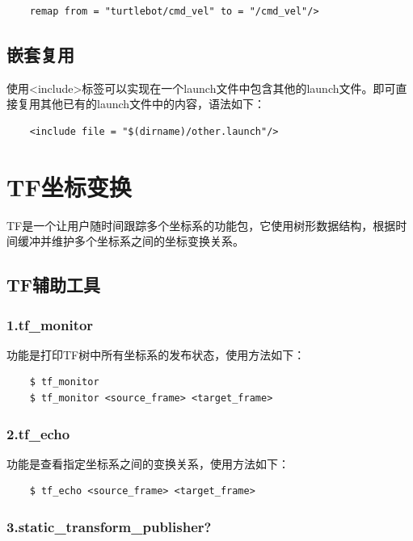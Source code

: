 \documentclass[9pt, oneside]{book}
\begin{document}
\begin{verbatim}
    remap from = "turtlebot/cmd_vel" to = "/cmd_vel"/>
\end{verbatim}

\subsection{嵌套复用}

使用<include>标签可以实现在一个launch文件中包含其他的launch文件。即可直接复用其他已有的launch文件中的内容，语法如下：

\begin{verbatim}
    <include file = "$(dirname)/other.launch"/>
\end{verbatim}

\section{TF坐标变换}

TF是一个让用户随时间跟踪多个坐标系的功能包，它使用树形数据结构，根据时间缓冲并维护多个坐标系之间的坐标变换关系。

\subsection{TF辅助工具}

\subsubsection{1.tf\_monitor}

功能是打印TF树中所有坐标系的发布状态，使用方法如下：

\begin{verbatim}
    $ tf_monitor
    $ tf_monitor <source_frame> <target_frame>
\end{verbatim}

\subsubsection{2.tf\_echo}

功能是查看指定坐标系之间的变换关系，使用方法如下：

\begin{verbatim}
    $ tf_echo <source_frame> <target_frame>
\end{verbatim}

\subsubsection{3.static\_transform\_publisher?}
\end{document}
